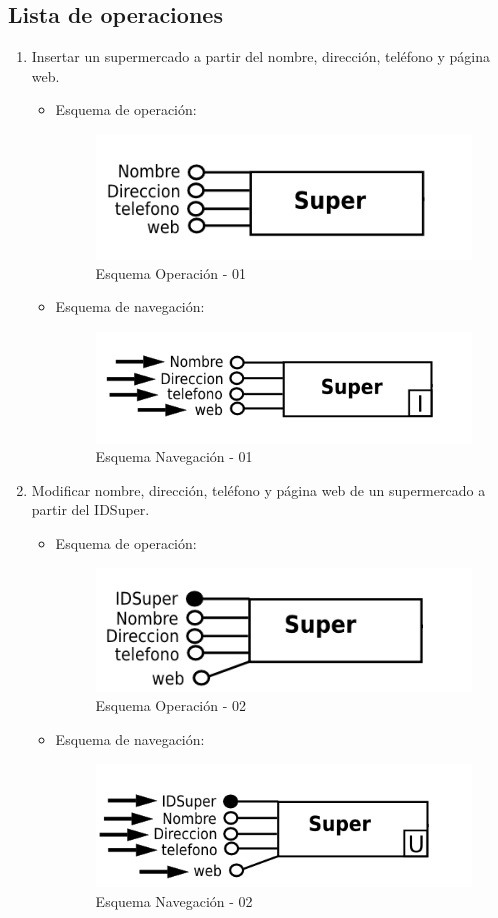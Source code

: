 \documentclass[a4paper,12pt]{report}
\begin{document}
\subsection{Lista de operaciones}
\label{sec-7-3-1}
\begin{enumerate}
\item Insertar un supermercado a partir del nombre, dirección,
teléfono y página web.
\begin{itemize}
\item Esquema de operación:
\begin{figure}[!htp]
\centering
\includegraphics[width=0.5\linewidth]{./operaciones/img/Super/01_ope.png}
\caption{Esquema Operación - 01}
\label{fig:ope01}
\medskip
\footnotesize
{}
\end{figure}
\item Esquema de navegación:
\begin{figure}[!htp]
\centering
\includegraphics[width=0.5\linewidth]{./operaciones/img/Super/01_nav.png}
\caption{Esquema Navegación - 01}
\label{fig:nave01}
\medskip
\footnotesize
{}
\end{figure}
\end{itemize}

\item Modificar nombre, dirección, teléfono y página web de un
supermercado a partir del IDSuper.
\begin{itemize}
\item Esquema de operación:
\begin{figure}[!htp]
\centering
\includegraphics[width=0.6\linewidth]{./operaciones/img/Super/02_ope.png}
\caption{Esquema Operación - 02}
\label{fig:ope02}
\medskip
\footnotesize
{}
\end{figure}
\item Esquema de navegación:
\begin{figure}[!htp]
\centering
\includegraphics[width=0.6\linewidth]{./operaciones/img/Super/02_nav.png}
\caption{Esquema Navegación - 02}
\label{fig:nave02}
\medskip
\footnotesize
{}
\end{figure}
\end{itemize}
\end{enumerate}
\end{document}
